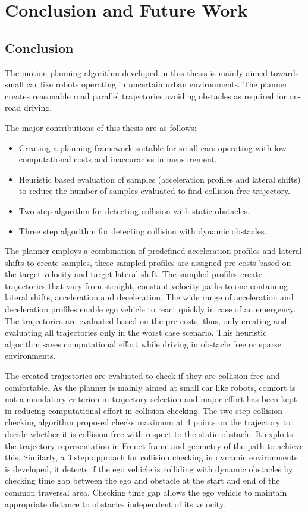 \chapter{Conclusion and Future Work}
\label{conclusion}
\section{Conclusion}

The motion planning algorithm developed in this thesis is mainly aimed towards small car like robots operating in uncertain urban environments. The planner creates reasonable road parallel trajectories avoiding obstacles as required for on-road driving.

The major contributions of this thesis are as follows:

\begin{itemize}
	\item Creating a planning framework suitable for small cars operating with low computational costs and inaccuracies in measurement.
	\item Heuristic based evaluation of samples (acceleration profiles and lateral shifts) to reduce the number of samples evaluated to find collision-free trajectory.
	\item Two step algorithm for detecting collision with static obstacles.
	\item Three step algorithm for detecting collision with dynamic obstacles.
\end{itemize}

The planner employs a combination of predefined acceleration profiles and lateral shifts to create samples, these sampled profiles are assigned pre-costs based on the target velocity and target lateral shift. The sampled profiles create trajectories that vary from straight, constant velocity paths to one containing lateral shifts, acceleration and deceleration. The wide range of acceleration and deceleration profiles enable ego vehicle to react quickly in case of an emergency. The trajectories are evaluated based on the pre-costs, thus, only creating and evaluating all trajectories only in the worst case scenario. This heuristic algorithm saves computational effort while driving in obstacle free or sparse environments.

The created trajectories are evaluated to check if they are collision free and comfortable. As the planner is mainly aimed at small car like robots, comfort is not a mandatory criterion in trajectory selection and major effort has been kept in reducing computational effort in collision checking. The two-step collision checking algorithm proposed checks maximum at 4 points on the trajectory to decide whether it is collision free with respect to the static obstacle. It exploits the trajectory representation in Frenet frame and geometry of the path to achieve this. Similarly, a 3 step approach for collision checking in dynamic environments is developed, it detects if the ego vehicle is colliding with dynamic obstacles by checking time gap between the ego and obstacle at the start and end of the common traversal area. Checking time gap allows the ego vehicle to maintain appropriate distance to obstacles independent of its velocity.

